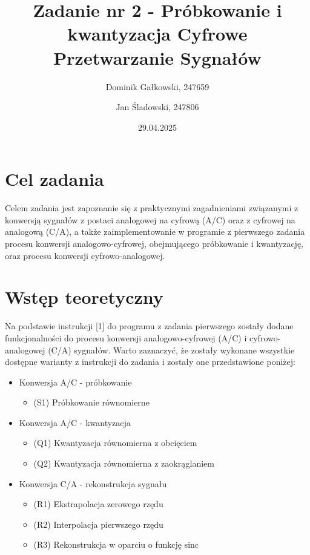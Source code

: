\documentclass{article}
\title{{\bf Zadanie nr 2 - Próbkowanie i kwantyzacja}\linebreak
Cyfrowe Przetwarzanie Sygnałów}
\author{Dominik Gałkowski, 247659 \and Jan Śladowski, 247806}
\date{29.04.2025}
\begin{document}
\clearpage\maketitle
\thispagestyle{empty}
\newpage
\setcounter{page}{1}
\section{Cel zadania}

Celem zadania jest zapoznanie się z praktycznymi zagadnieniami związanymi z konwersją sygnałów z postaci analogowej na cyfrową (A/C) oraz z cyfrowej na analogową (C/A), a także zaimplementowanie w programie z pierwszego zadania procesu konwersji analogowo-cyfrowej, obejmującego próbkowanie i kwantyzację, oraz procesu konwersji cyfrowo-analogowej.

\section{Wstęp teoretyczny}

Na podstawie instrukcji [1] do programu z zadania
pierwszego zostały dodane funkcjonalności do procesu konwersji analogowo-cyfrowej (A/C)
i cyfrowo-analogowej (C/A) sygnałów. Warto zaznaczyć, że zostały wykonane wszystkie
dostępne warianty z instrukcji do zadania i zostały one przedstawione poniżej:

\begin{itemize}
    \item {Konwersja A/C - próbkowanie}
    \begin{itemize}
        \item (S1) Próbkowanie równomierne
    \end{itemize}

    \item {Konwersja A/C - kwantyzacja}
    \begin{itemize}
        \item (Q1) Kwantyzacja równomierna z obcięciem
        \item (Q2) Kwantyzacja równomierna z zaokrąglaniem
    \end{itemize}

    \item {Konwersja C/A - rekonstrukcja sygnału}
    \begin{itemize}
        \item (R1) Ekstrapolacja zerowego rzędu
        \item (R2) Interpolacja pierwszego rzędu
        \item (R3) Rekonstrukcja w oparciu o funkcję sinc
    \end{itemize}
\end{itemize}
\end{document}
